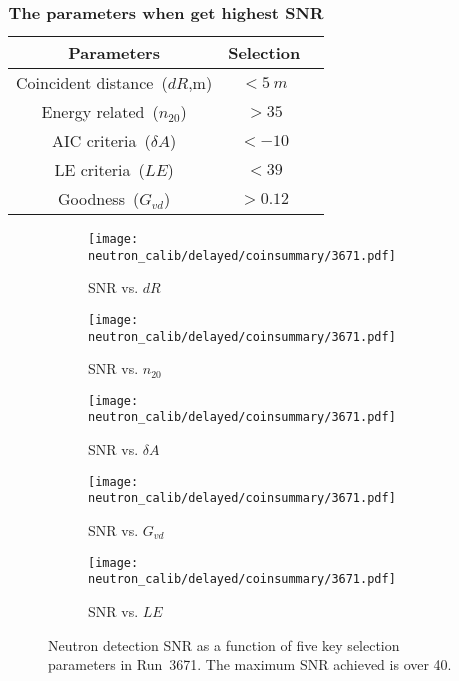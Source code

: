 \begin{table}[htbp]
	\caption{\textbf{The parameters when get highest SNR}}%
	\label{tab:param-scan-snr}
	\centering%
	\begin{tabular}{ccc}
		\toprule%
		Parameters                   & Selection    \\
		\midrule%
		Coincident distance~($dR$,m) & $<\SI{5}{m}$ \\
		Energy related~($n_{20}$)    & $>35$        \\
		AIC criteria~($\delta A$)    & $<-10$       \\
		LE criteria~($LE$)           & $<39$        \\
		Goodness~($G_{vd}$)          & $>0.12$      \\
		\bottomrule
	\end{tabular}
\end{table}

\begin{figure}[h]
	\centering
	\begin{subfigure}{0.5\textwidth}
		\centering
		\texttt{[image: neutron\_calib/delayed/coinsummary/3671.pdf]}
		\caption{SNR vs. $dR$}
		\label{fig:snrdR}
	\end{subfigure}%
	\begin{subfigure}{0.5\textwidth}
		\centering
		\texttt{[image: neutron\_calib/delayed/coinsummary/3671.pdf]}
		\caption{SNR vs. $n_{20}$}
		\label{fig:snrn20}
	\end{subfigure}
	\begin{subfigure}{0.5\textwidth}
		\centering
		\texttt{[image: neutron\_calib/delayed/coinsummary/3671.pdf]}
		\caption{SNR vs. $\delta A$}
		\label{fig:snrdA}
	\end{subfigure}%
	\begin{subfigure}{0.5\textwidth}
		\centering
		\texttt{[image: neutron\_calib/delayed/coinsummary/3671.pdf]}
		\caption{SNR vs. $G_{vd}$}
		\label{fig:snrGvd}
	\end{subfigure}
	\begin{subfigure}{0.5\textwidth}
		\centering
		\texttt{[image: neutron\_calib/delayed/coinsummary/3671.pdf]}
		\caption{SNR vs. $LE$}
		\label{fig:snrLE}
	\end{subfigure}
	\caption{Neutron detection SNR as a function of five key selection parameters in Run~3671. The maximum SNR achieved is over 40.}
	\label{fig:High-snr}
\end{figure}

